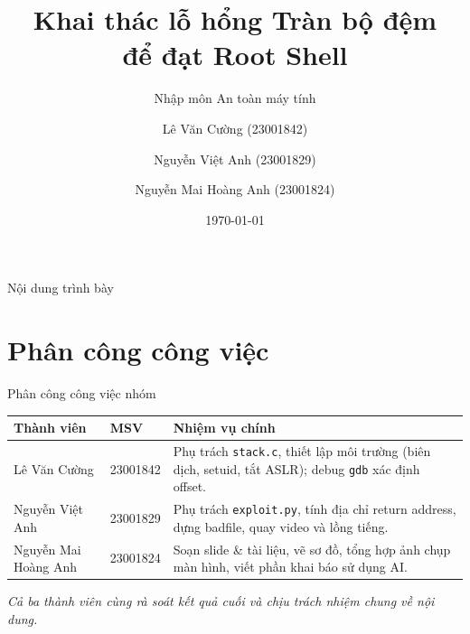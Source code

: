 \documentclass[aspectratio=169,10pt]{beamer}
\title[Tràn bộ đệm]{Khai thác lỗ hổng Tràn bộ đệm \\ để đạt Root Shell}
\subtitle{Nhập môn An toàn máy tính}
\author[Nhóm 3]{Lê Văn Cường (23001842) \and Nguyễn Việt Anh (23001829) \and Nguyễn Mai Hoàng Anh (23001824)}
\institute[HUS]{Trường Đại học Khoa học Tự nhiên}
\date{\today}
\begin{document}
\begin{frame}[plain]
  \titlepage
\end{frame}

\begin{frame}{Nội dung trình bày}
  \tableofcontents
\end{frame}

\section{Phân công công việc}
\begin{frame}{Phân công công việc nhóm}
  \small
  \begin{table}
    \begin{tabular}{p{3.2cm} p{3cm} p{5.2cm}}
      \toprule
      \textbf{Thành viên} & \textbf{MSV} & \textbf{Nhiệm vụ chính} \\
      \midrule
      Lê Văn Cường & 23001842 &
        Phụ trách \texttt{stack.c}, thiết lập môi trường (biên dịch, setuid,
        tắt ASLR); debug \texttt{gdb} xác định offset. \\
      \addlinespace
      Nguyễn Việt Anh & 23001829 &
        Phụ trách \texttt{exploit.py}, tính địa chỉ return address, dựng badfile,
        quay video và lồng tiếng. \\
      \addlinespace
      Nguyễn Mai Hoàng Anh & 23001824 &
        Soạn slide \& tài liệu, vẽ sơ đồ, tổng hợp ảnh chụp màn hình,
        viết phần khai báo sử dụng AI. \\
      \bottomrule
    \end{tabular}
  \end{table}
  \footnotesize\textit{Cả ba thành viên cùng rà soát kết quả cuối và chịu trách nhiệm chung về nội dung.}
\end{frame}

\end{document}
